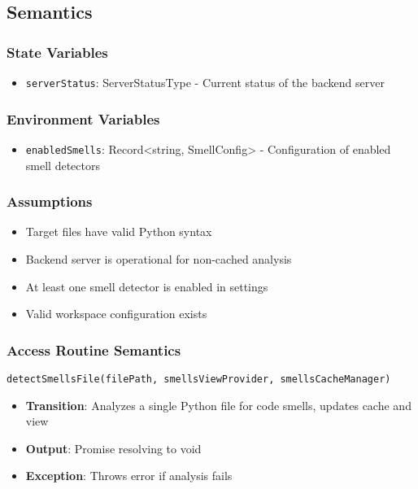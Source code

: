 \documentclass[12pt, titlepage]{article}
\begin{document}
\subsection{Semantics}

\subsubsection{State Variables}
\begin{itemize}
\item \texttt{serverStatus}: ServerStatusType - Current status of the backend server
\end{itemize}

\subsubsection{Environment Variables}
\begin{itemize}
\item \texttt{enabledSmells}: Record<string, SmellConfig> - Configuration of enabled smell detectors
\end{itemize}

\subsubsection{Assumptions}
\begin{itemize}
\item Target files have valid Python syntax
\item Backend server is operational for non-cached analysis
\item At least one smell detector is enabled in settings
\item Valid workspace configuration exists
\end{itemize}

\subsubsection{Access Routine Semantics}
\texttt{detectSmellsFile(filePath, smellsViewProvider, smellsCacheManager)}
\begin{itemize}
\item \textbf{Transition}: Analyzes a single Python file for code smells, updates cache and view
\item \textbf{Output}: Promise resolving to void
\item \textbf{Exception}: Throws error if analysis fails
\end{itemize}
\end{document}
